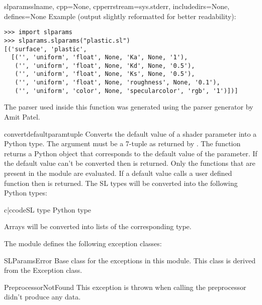 \begin{funcdesc}{slparams}{slname, cpp=None, cpperrstream=sys.stderr, includedirs=None, defines=None}
Example (output slightly reformatted for better readability):
 
\begin{verbatim}
>>> import slparams
>>> slparams.slparams("plastic.sl")
[('surface', 'plastic', 
  [('', 'uniform', 'float', None, 'Ka', None, '1'),
   ('', 'uniform', 'float', None, 'Kd', None, '0.5'),
   ('', 'uniform', 'float', None, 'Ks', None, '0.5'),
   ('', 'uniform', 'float', None, 'roughness', None, '0.1'),
   ('', 'uniform', 'color', None, 'specularcolor', 'rgb', '1')])]
\end{verbatim}

The parser used inside this function was generated using the parser
generator  
by Amit Patel.
\end{funcdesc}

\begin{funcdesc}{convertdefault}{paramtuple}
Converts the default value of a shader parameter into a Python
type. The argument  must be a 7-tuple as returned by
. The function returns a Python object that corresponds to
the default value of the parameter. If the default value can't be
converted then  is returned. Only the functions that are
present in the  module are evaluated. If a default value
calls a user defined function then  is returned. The SL
types will be converted into the following Python types:

\begin{tableii}{c|c}{code}{SL type }{ Python type}
\end{tableii}

Arrays will be converted into lists of the corresponding type.
\end{funcdesc}

The module defines the following exception classes:

\begin{excdesc}{SLParamsError}
Base class for the exceptions in this module. This class is derived
from the Exception class.
\end{excdesc}

\begin{excdesc}{PreprocessorNotFound}
This exception is thrown when calling the preprocessor didn't produce
any data.
\end{excdesc}

